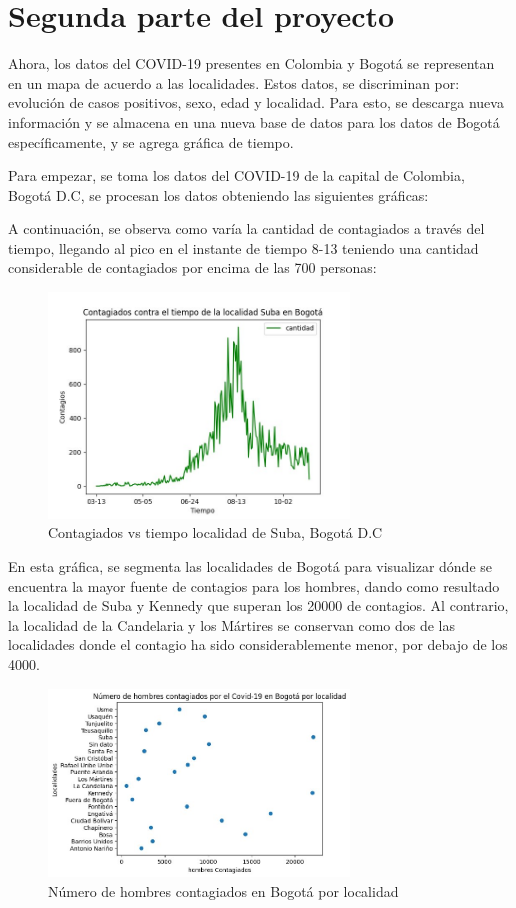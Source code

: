 \documentclass[conference,compsoc,onecolumn]{IEEEtran}
\begin{document}
\section{Segunda parte del proyecto}

Ahora, los datos del COVID-19 presentes en Colombia y Bogotá se representan en un mapa de acuerdo a las localidades. Estos datos, se discriminan por: evolución de casos positivos, sexo, edad y localidad. Para esto, se descarga nueva información y se almacena en una nueva base de datos para los datos de Bogotá específicamente, y se agrega gráfica de tiempo.

\medskip

Para empezar, se toma los datos del COVID-19 de la capital de Colombia, Bogotá D.C, se procesan los datos obteniendo las siguientes gráficas:

\smallskip

A continuación, se observa como varía la cantidad de contagiados a través del tiempo, llegando al pico en el instante de tiempo 8-13 teniendo una cantidad considerable de contagiados por encima  de las 700 personas: 
\begin{figure}[H]
\centering  
\includegraphics[width=8cm]{./images/contagiosSuba.jpg}
\caption{Contagiados vs tiempo localidad de Suba, Bogotá D.C}
\label{fig:mesh1}
\end{figure}

\smallskip

En esta gráfica, se segmenta las localidades de Bogotá para visualizar dónde se encuentra la mayor fuente de contagios para los hombres, dando como resultado la localidad de Suba y Kennedy que superan los 20000 de contagios. Al contrario, la localidad de la Candelaria y los Mártires se conservan como dos de las localidades donde el contagio ha sido considerablemente menor, por debajo de los 4000.  

\begin{figure}[H]
\centering  
\includegraphics[width=8cm]{./images/hombresLocalidad.jpg}
\caption{Número de hombres contagiados en Bogotá por localidad}
\label{fig:mesh1}
\end{figure}
\end{document}
